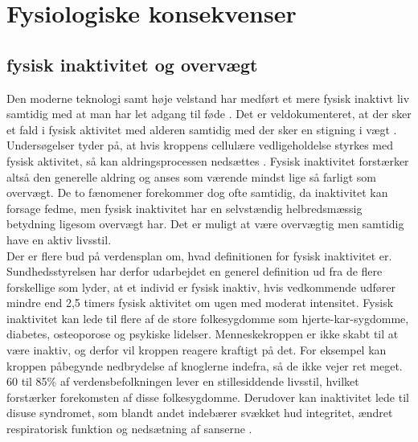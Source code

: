 \section{Fysiologiske konsekvenser}


\subsection{fysisk inaktivitet og overvægt}
Den moderne teknologi samt høje velstand har medført et mere fysisk inaktivt liv samtidig med at man har let adgang til føde \citep{Kiens2007}. Det er veldokumenteret, at der sker et fald i fysisk aktivitet med alderen samtidig med der sker en stigning i vægt \citep{Kaprio2008}. Undersøgelser tyder på, at hvis kroppens cellulære vedligeholdelse styrkes med fysisk aktivitet, så kan aldringsprocessen nedsættes \citep{Knight2012}. Fysisk inaktivitet forstærker altså den generelle aldring og anses som værende mindst lige så farligt som overvægt. De to fænomener forekommer dog ofte samtidig, da inaktivitet kan forsage fedme, men fysisk inaktivitet har en selvstændig helbredsmæssig betydning ligesom overvægt har. Det er muligt at være overvægtig men samtidig have en aktiv livsstil. \citep{Kiens2007,Kaprio2008,Hjort1997}\\
Der er flere bud på verdensplan om, hvad definitionen for fysisk inaktivitet er. Sundhedsstyrelsen har derfor udarbejdet en generel definition ud fra de flere forskellige som lyder, at et individ er fysisk inaktiv, hvis vedkommende udfører mindre end 2,5 timers fysisk aktivitet om ugen med moderat intensitet. \citep{Kiens2007} Fysisk inaktivitet kan lede til flere af de store folkesygdomme som hjerte-kar-sygdomme, diabetes, osteoporose og psykiske lidelser. Menneskekroppen er ikke skabt til at være inaktiv, og derfor vil kroppen reagere kraftigt på det. For eksempel kan kroppen påbegynde nedbrydelse af knoglerne indefra, så de ikke vejer ret meget. 60 til 85\% af verdensbefolkningen lever en stillesiddende livsstil, hvilket forstærker forekomsten af disse folkesygdomme. \citep{Kiens2007,Reshma2002,Martini2012} Derudover kan inaktivitet lede til disuse syndromet, som blandt andet indebærer svækket hud integritet, ændret respiratorisk funktion og nedsætning af sanserne \citep{Knight2012,Mosby2009}. \\
